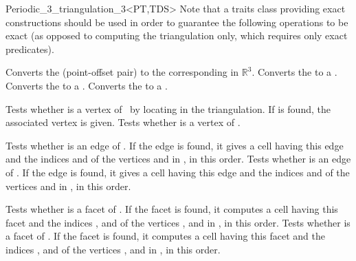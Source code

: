 \begin{ccRefClass}{Periodic_3_triangulation_3<PT,TDS>}
Note that a traits class providing exact constructions should be used
in order to guarantee the following operations to be exact (as opposed
to computing the triangulation only, which requires only exact
predicates).

{Converts the   (point-offset pair) to the
  corresponding  in $\mathbb R^3$.}
\ccGlue
{}
{Converts the   to a .}
\ccGlue
{}
{Converts the   to a .}
\ccGlue
{}
{Converts the   to a .}


{Tests whether  is a vertex of \ccVar\ by locating  in
the triangulation. If  is found, the associated vertex 
is given.}
\ccGlue
{}
{Tests whether  is a vertex of \ccVar.}

{Tests whether  is an edge of \ccVar. If the edge is found,
it gives a cell  having this edge and the indices 
and  of the vertices  and  in , in this order.  
}
\ccGlue
{}
{Tests whether  is an edge of
  \ccVar. If the edge is found, it gives a cell  having this
  edge and the indices  and  of the vertices  and
   in , in this order. 
}

{Tests whether  is a facet of \ccVar. If the facet is found,
it computes a cell  having this facet and the indices ,
 and  of the vertices ,  and  in , 
in this order.  
}
\ccGlue
{}
{Tests whether 
is a facet of \ccVar. If the facet is found,
it computes a cell  having this facet and the indices ,
 and  of the vertices ,  and  in , 
in this order.  
}


\end{ccRefClass}
